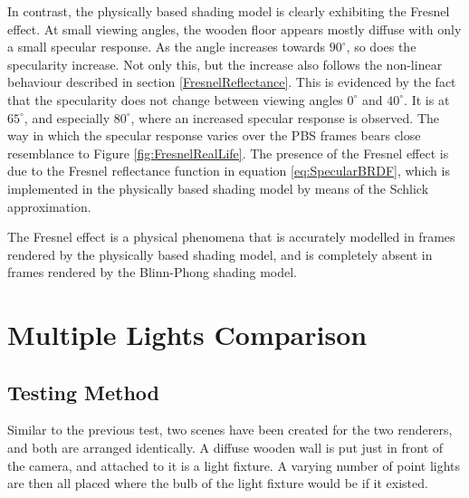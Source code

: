 In contrast, the physically based shading model is clearly exhibiting the Fresnel effect. At small viewing angles, the wooden floor appears mostly diffuse with only a small specular response. As the angle increases towards \begin{math}90^{\circ}\end{math}, so does the specularity increase. Not only this, but the increase also follows the non-linear behaviour described in section \ref{FresnelReflectance}. This is evidenced by the fact that the specularity does not change between viewing angles \begin{math}0^{\circ}\end{math} and \begin{math}40^{\circ}\end{math}. It is at \begin{math}65^{\circ}\end{math}, and especially \begin{math}80^{\circ}\end{math}, where an increased specular response is observed. The way in which the specular response varies over the PBS frames bears close resemblance to Figure \ref{fig:FresnelRealLife}. The presence of the Fresnel effect is due to the Fresnel reflectance function in equation \ref{eq:SpecularBRDF}, which is implemented in the physically based shading model by means of the Schlick approximation.

The Fresnel effect is a physical phenomena that is accurately modelled in frames rendered by the physically based shading model, and is completely absent in frames rendered by the Blinn-Phong shading model.

\section{Multiple Lights Comparison}

\subsection{Testing Method}

Similar to the previous test, two scenes have been created for the two renderers, and both are arranged identically. A diffuse wooden wall is put just in front of the camera, and attached to it is a light fixture. A varying number of point lights are then all placed where the bulb of the light fixture would be if it existed.

